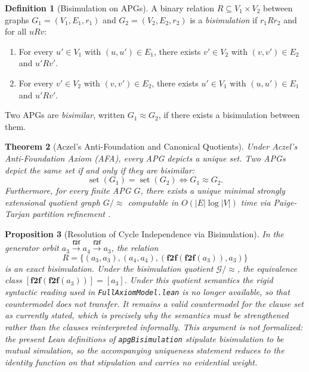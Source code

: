 \documentclass[11pt]{article}
\newtheorem{theorem}{Theorem}[section]
\newtheorem{proposition}[theorem]{Proposition}
\theoremstyle{definition}
\newtheorem{definition}[theorem]{Definition}
\begin{document}
\begin{definition}[Bisimulation on APGs]
A binary relation $R \subseteq V_1 \times V_2$ between graphs $G_1 = (V_1, E_1, r_1)$ and $G_2 = (V_2, E_2, r_2)$ is a \emph{bisimulation} if $r_1 R r_2$ and for all $u R v$:
\begin{enumerate}
\item For every $u' \in V_1$ with $(u, u') \in E_1$, there exists $v' \in V_2$ with $(v, v') \in E_2$ and $u' R v'$.
\item For every $v' \in V_2$ with $(v, v') \in E_2$, there exists $u' \in V_1$ with $(u, u') \in E_1$ and $u' R v'$.
\end{enumerate}
Two APGs are \emph{bisimilar}, written $G_1 \approx G_2$, if there exists a bisimulation between them.
\end{definition}

\begin{theorem}[Aczel's Anti-Foundation and Canonical Quotients]
Under Aczel's Anti-Foundation Axiom (AFA), every APG depicts a unique set. Two APGs depict the same set if and only if they are bisimilar:
\[
\operatorname{set}(G_1) = \operatorname{set}(G_2) \iff G_1 \approx G_2.
\]
Furthermore, for every finite APG $G$, there exists a unique minimal strongly extensional quotient graph $G / \approx$ computable in $O(|E| \log |V|)$ time via Paige-Tarjan partition refinement \cite{paige_tarjan}.
\end{theorem}

\begin{proposition}[Resolution of Cycle Independence via Bisimulation]
In the generator orbit $a_3 \xrightarrow{\mathbf{f2f}} a_4 \xrightarrow{\mathbf{f2f}} a_3$, the relation
\[
R = \{(a_3, a_3), (a_4, a_4), (\mathbf{f2f}(\mathbf{f2f}(a_3)), a_3)\}
\]
is an exact bisimulation. Under the bisimulation quotient $\mathcal{G} / \approx$, the equivalence class $[\mathbf{f2f}(\mathbf{f2f}(a_3))] = [a_3]$. Under this quotient semantics the rigid syntactic reading used in \texttt{FullAxiomModel.lean} is no longer available, so that countermodel does not transfer. It remains a valid countermodel for the clause set as currently stated, which is precisely why the semantics must be strengthened rather than the clauses reinterpreted informally. This argument is not formalized: the present Lean definitions of \texttt{apgBisimulation} stipulate bisimulation to be mutual simulation, so the accompanying uniqueness statement reduces to the identity function on that stipulation and carries no evidential weight.
\end{proposition}
\end{document}
